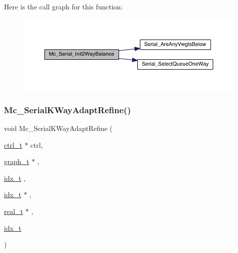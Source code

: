 Here is the call graph for this function\+:\nopagebreak
\begin{figure}[H]
\begin{center}
\leavevmode
\includegraphics[width=350pt]{a00951_ae397fc4e64666390e696046f73e4e8e7_cgraph}
\end{center}
\end{figure}
\mbox{\label{a00951_aca801701a68b2602598dcaaaff59fdff}} 
\subsubsection{\texorpdfstring{Mc\+\_\+\+Serial\+K\+Way\+Adapt\+Refine()}{Mc\_SerialKWayAdaptRefine()}}
{\footnotesize\ttfamily void Mc\+\_\+\+Serial\+K\+Way\+Adapt\+Refine (\begin{DoxyParamCaption}\item[{\hyperlink{a00742}{ctrl\+\_\+t} $\ast$}]{ctrl,  }\item[{\hyperlink{a00734}{graph\+\_\+t} $\ast$}]{,  }\item[{\hyperlink{a00876_aaa5262be3e700770163401acb0150f52}{idx\+\_\+t}}]{,  }\item[{\hyperlink{a00876_aaa5262be3e700770163401acb0150f52}{idx\+\_\+t} $\ast$}]{,  }\item[{\hyperlink{a00876_a1924a4f6907cc3833213aba1f07fcbe9}{real\+\_\+t} $\ast$}]{,  }\item[{\hyperlink{a00876_aaa5262be3e700770163401acb0150f52}{idx\+\_\+t}}]{ }\end{DoxyParamCaption})}

